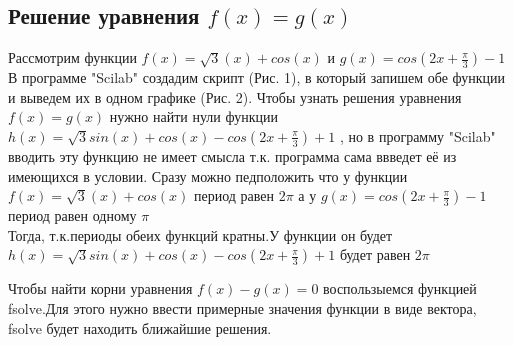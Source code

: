 \documentclass[russian,utf8,nocolumnxxxi,nocolumnxxxii]{eskdtext}
\begin{document}
\subsection{Решение уравнения $f(x)=g(x)$}

\normalsize  Рассмотрим функции $f(x)=\sqrt{3}(x)+cos(x)$ и $g(x)=cos(2x+\frac{\pi}{3})-1$ 
В программе "Scilab" создадим скрипт (Рис. 1), в который запишем обе функции и выведем их в одном графике (Рис. 2).
Чтобы узнать решения уравнения $f(x)=g(x)$ нужно найти нули функции $h(x)=\sqrt{3}sin(x)+cos(x)-cos(2x+\frac{\pi}{3})+1$ , но в программу "Scilab" вводить эту функцию не имеет смысла т.к. программа сама ввведет её из имеющихся в условии.
Сразу можно педположить что у функции $f(x)=\sqrt{3}(x)+cos(x)$ период равен $2\pi$ а у $g(x)=cos(2x+\frac{\pi}{3})-1$ период равен одному $\pi$ \\ Тогда, т.к.периоды обеих функций кратны.У функции он будет $h(x)=\sqrt{3}sin(x)+cos(x)-cos(2x+\frac{\pi}{3})+1$ будет равен $2\pi$ 
 
 
\normalsize Чтобы найти корни уравнения $f(x)-g(x)=0$ воспользыемся функцией fsolve.Для этого нужно ввести примерные значения функции в виде вектора,  fsolve будет находить ближайшие решения.
\end{document}
